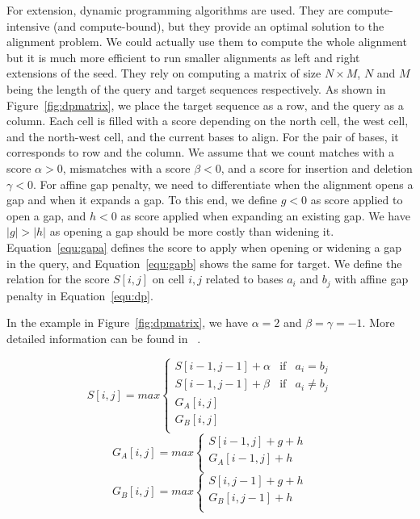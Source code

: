 For extension, dynamic programming algorithms are used. They are compute-intensive (and compute-bound), but they provide an optimal solution to the alignment problem. We could actually use them to compute the whole alignment but it is much more efficient to run smaller alignments as left and right extensions of the seed. They rely on computing a matrix of size $N \times M$, $N$ and $M$ being the length of the query and target sequences respectively. As shown in Figure~\ref{fig:dpmatrix}, we place the target sequence as a row, and the query as a column. Each cell is filled with a score depending on the north cell, the west cell, and the north-west cell, and the current bases to align. For the pair of bases, it corresponds to row and the column. We assume that we count matches with a score $\alpha > 0$, mismatches with a score $\beta < 0$, and a score for insertion and deletion $\gamma < 0$. For affine gap penalty, we need to differentiate when the alignment opens a gap and when it expands a gap. To this end, we define $g < 0$ as score applied to open a gap, and $h < 0$ as score applied when expanding an existing gap. We have $|g| > |h|$ as opening a gap should be more costly than widening it. Equation~\ref{equ:gapa} defines the score to apply when opening or widening a gap in the query, and Equation~\ref{equ:gapb} shows the same for target. We define the relation for the score $S[i,j]$ on cell $i,j$ related to bases $a_i$ and $b_j$ with affine gap penalty in Equation~\ref{equ:dp}.

In the example in Figure~\ref{fig:dpmatrix}, we have $\alpha = 2$ and $\beta = \gamma = -1$. More detailed information can be found in ~\cite{Aluru:2005:HCM:1121650}.

\begin{equation}
 	S[i,j] = max \left\{
 	\begin{array}{llll}
 		S[i-1, j-1] + \alpha & \mbox{if} & a_i = b_j \\
 		S[i-1, j-1] + \beta & \mbox{if} & a_i \neq b_j \\
 		G_{A}[i,j] \\
 		G_{B}[i,j]\\
 	\end{array}
 	\right.
 	\label{equ:dp}
 \end{equation}
 \begin{equation}
 	G_{A}[i,j] = max \left\{
 	\begin{array}{ll}
 		S[i-1, j] + g + h \\
 		G_{A}[i-1,j] + h \\
 		 
 	\end{array}
 	\right.
 	\label{equ:gapa}
 \end{equation}
  \begin{equation}
 	G_{B}[i,j] = max \left\{
 	\begin{array}{ll}
 		S[i, j-1] + g + h \\
 		G_{B}[i,j-1] + h \\
 		 
 	\end{array}
 	\right.
 	\label{equ:gapb}
 \end{equation}
 
